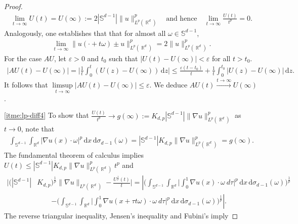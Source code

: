 \documentclass[12pt, reqno]{amsart}%
\theoremstyle{plain}  %
\theoremstyle{definition}  %
\theoremstyle{remark}
\numberwithin{equation}{section}
\DeclareMathOperator{\R}{\mathbb{R}}
\renewcommand{\d}{\,\mathrm{d}}
\begin{document}
\begin{proof}
\begin{align*}
\lim_{t\to\infty}U(t)=U(\infty):= 2|\mathbb{S}^{d-1}|\|u\|^p_{L^p(\R^d)}\quad\text{and hence}\quad \lim_{t\to\infty}\frac{U(t)}{t^p}=0.
\end{align*}
Analogously, one establishes that that for almost all $\omega\in \mathbb{S}^{d-1}$,
\begin{align*}
\lim_{t\to\infty}\|u(\cdot+ t\omega)\pm u\|^p_{L^p(\R^d)}= 2\|u\|^p_{L^p(\R^d)}.
\end{align*}
For the case $AU$, let $\varepsilon>0$ and $t_0$ such that $|U(t) -U(\infty)|<\varepsilon$ for all $t>t_0$.
\begin{align*}
 |AU(t) -U(\infty)|= \Big|\frac{1}{t}\int_0^t(U(z) -U(\infty))\d z\Big|\leq \frac{\varepsilon(t-t_0) }{t}+ \frac{1}{t}\int_{0}^{t_0} |U(z) -U(\infty)|\d z.
\end{align*}
It follows that $\limsup\limits_{t\to\infty} |AU(t) -U(\infty)|\leq  \varepsilon$. We deduce $AU(t)\xrightarrow{t\to\infty} U(\infty)$.
 \smallskip

\noindent \eqref{itme:lp-diff4} To show that $\frac{U(t)}{t^p}\to g(\infty):=K_{d,p}|\mathbb{S}^{d-1}|\|\nabla u\|^p_{L^p(\R^d)}$ as $t\to 0$, note that 
\begin{align*}
\int_{ \mathbb{S}^{d-1}}\int_{\R^d}|\nabla u(x)\cdot \omega|^p\d x  \d\sigma_{d-1}(\omega)= |\mathbb{S}^{d-1}|K_{d,p}\|\nabla u\|^p_{L^p(\R^d)}= g(\infty).
\end{align*}
The fundamental theorem of calculus  implies
$U(t)\leq |\mathbb{S}^{d-1}| K_{d,p}\|\nabla u\|^p_{L^p(\R^d)}t^p $ and 
\begin{align*}
\Big|(|\mathbb{S}^{d-1}|&K_{d,p})^{\frac{1}{p}}
\|\nabla u\|_{L^p(\R^d)}-\frac{U^{\frac{1}{p}}(t)}{t} \Big|
=\left|\Big( \int_{\mathbb{S}^{d-1}} \int_{\R^d} \Big| \int_0^1\nabla u(x)\cdot\omega\ d \tau \Big|^p \d x \d\sigma_{d-1}(\omega)\Big)^{\frac{1}{p}}\right.
\\ &\qquad\left.-\Big( \int_{\mathbb{S}^{d-1}} \int_{\R^d} \Big| \int_0^1\nabla u(x+ \tau t\omega)\cdot \omega\ d \tau \Big|^p \d x \d\sigma_{d-1}(\omega)\Big)^{\frac{1}{p}}\right|. 
\end{align*}
The reverse triangular inequality, Jensen's inequality and Fubini's imply


\end{proof}
\end{document}

